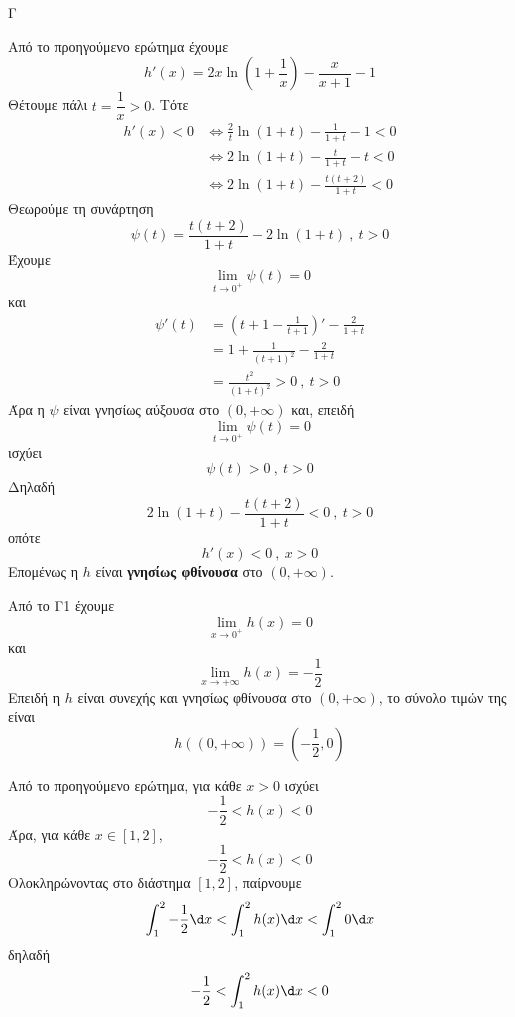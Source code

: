 \begin{thema}{Γ}
\begin{erwthma}
\item Από το προηγούμενο ερώτημα έχουμε
\[h'(x)=2x\ln\left(1+\frac{1}{x}\right)-\frac{x}{x+1}-1\]
Θέτουμε πάλι $t=\dfrac{1}{x}>0$. Τότε
\begin{align*}
h'(x)<0
&\Leftrightarrow \frac{2}{t}\ln(1+t)-\frac{1}{1+t}-1<0\\
&\Leftrightarrow 2\ln(1+t)-\frac{t}{1+t}-t<0\\
&\Leftrightarrow 2\ln(1+t)-\frac{t(t+2)}{1+t}<0
\end{align*}
Θεωρούμε τη συνάρτηση
\[\psi(t)=\frac{t(t+2)}{1+t}-2\ln(1+t)\ ,\ t>0\]
Έχουμε
\[\lim\limits_{t\to 0^+}\psi(t)=0\]
και
\begin{align*}
\psi'(t)&=\left(t+1-\frac{1}{t+1}\right)'-\frac{2}{1+t}\\
&=1+\frac{1}{(t+1)^2}-\frac{2}{1+t}\\
&=\frac{t^2}{(1+t)^2}>0\ ,\ t>0
\end{align*}
Άρα η $\psi$ είναι γνησίως αύξουσα στο $(0,+\infty)$ και, επειδή
\[\lim\limits_{t\to 0^+}\psi(t)=0\]
ισχύει
\[\psi(t)>0\ ,\ t>0\]
Δηλαδή
\[2\ln(1+t)-\frac{t(t+2)}{1+t}<0\ ,\ t>0\]
οπότε
\[h'(x)<0\ ,\ x>0\]
Επομένως η $h$ είναι \textbf{γνησίως φθίνουσα} στο $(0,+\infty)$.

Από το Γ1 έχουμε
\[\lim\limits_{x\to 0^+}h(x)=0\]
και
\[\lim\limits_{x\to+\infty}h(x)=-\frac{1}{2}\]
Επειδή η $h$ είναι συνεχής και γνησίως φθίνουσα στο $(0,+\infty)$, το σύνολο τιμών της είναι
\[h((0,+\infty))=\left(-\frac{1}{2},0\right)\]

\item Από το προηγούμενο ερώτημα, για κάθε $x>0$ ισχύει
\[-\frac{1}{2}<h(x)<0\]
Άρα, για κάθε $x\in[1,2]$,
\[-\frac{1}{2}<h(x)<0\]
Ολοκληρώνοντας στο διάστημα $[1,2]$, παίρνουμε
\[\dint_1^2 -\frac{1}{2}\d x<\dint_1^2 h(x)\d x<\dint_1^2 0\d x\]
δηλαδή
\[-\frac{1}{2}<\dint_1^2 h(x)\d x<0\]
\end{erwthma}
\end{thema}

